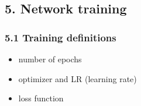 \documentclass[10pt]{article}
\providecommand{\tightlist}{%
      \setlength{\itemsep}{0pt}\setlength{\parskip}{0pt}}
\begin{document}
    \hypertarget{network-training}{%
\subsection{5. Network training}\label{network-training}}

    \hypertarget{training-definitions}{%
\subsubsection{5.1 Training definitions}\label{training-definitions}}

\begin{itemize}
\tightlist
\item
  number of epochs
\item
  optimizer and LR (learning rate)
\item
  loss function
\end{itemize}
\end{document}
